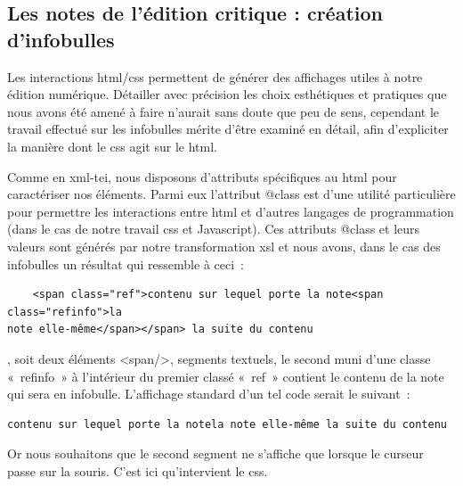 \documentclass[12pt, a4paper]{article}
\begin{document}
\subsection{Les notes de l'édition critique : création d'infobulles}

\label{htmlCssInfo}


Les interactions html/css permettent de générer des affichages utiles à notre édition numérique. Détailler avec précision les choix esthétiques et pratiques que nous avons été amené à faire n'aurait sans doute que peu de sens, cependant le travail effectué sur les infobulles mérite d'être examiné en détail, afin d'expliciter la manière dont le css agit sur le html.




Comme en xml-tei, nous disposons d'attributs spécifiques au html pour caractériser nos éléments. Parmi eux l'attribut @class est d'une utilité particulière pour permettre les interactions entre html et d'autres langages de programmation (dans le cas de notre travail css et Javascript). Ces attributs @class et leurs valeurs sont générés par notre transformation xsl et nous avons, dans le cas des infobulles un résultat qui ressemble à ceci~:

\begin{verbatim}
    <span class="ref">contenu sur lequel porte la note<span class="refinfo">la
note elle-même</span></span> la suite du contenu
\end{verbatim}
, soit deux éléments <span/>, segments textuels, le second muni d'une classe «~refinfo~» à l'intérieur du premier classé «~ref~» contient le contenu de la note qui sera en infobulle. L'affichage standard d'un tel code serait le suivant~:
\begin{verbatim}contenu sur lequel porte la notela note elle-même la suite du contenu\end{verbatim}
Or nous souhaitons que le second segment ne s'affiche que lorsque le curseur passe sur la souris. C'est ici qu'intervient le css.
\end{document}
